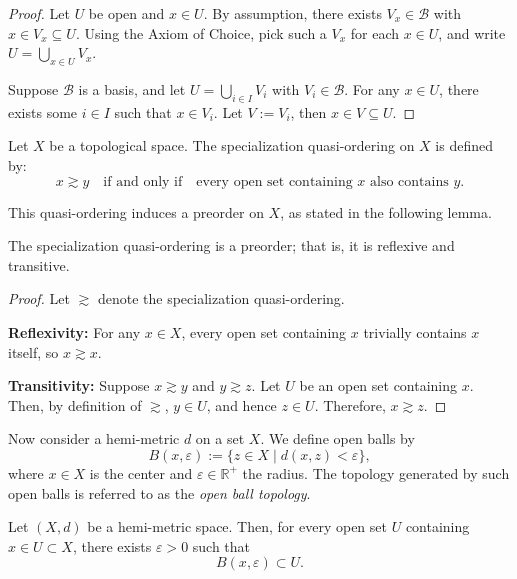 \begin{proof}
Let \(U\) be open and \(x \in U\). 
By assumption, there exists \(V_x \in \mathcal{B}\) with \(x \in V_x \subseteq U\).  
Using the Axiom of Choice, pick such a \(V_x\) for each \(x \in U\), and write \(U = \bigcup\limits_{x \in U} V_x\).

Suppose \(\mathcal{B}\) is a basis, and let \(U = \bigcup\limits_{i \in I} V_i\) with \(V_i \in \mathcal{B}\). 
For any \(x \in U\), there exists some \(i \in I\) such that \(x \in V_i\). Let \(V := V_i\), then \(x \in V \subseteq U\).
\end{proof}


\begin{definition}\label{def:quasi-ordering}
Let $X$ be a topological space. 
The specialization quasi-ordering on $X$ is defined by:
\[
x \gtrsim y \quad \text{if and only if} \quad \text{every open set containing } x \text{ also contains } y.
\]
\end{definition}

This quasi-ordering induces a preorder on $X$, as stated in the following lemma.


\begin{lemma}[Preorder]\label{lemma:preorder}
The specialization quasi-ordering is a preorder; that is, it is reflexive and transitive.
\end{lemma}


\begin{proof}
Let $\gtrsim$ denote the specialization quasi-ordering.

\textbf{Reflexivity:} For any $x \in X$, every open set containing $x$ trivially contains $x$ itself, so $x \gtrsim x$.

\textbf{Transitivity:} Suppose $x \gtrsim y$ and $y \gtrsim z$. Let $U$ be an open set containing $x$. Then, by definition of $\gtrsim$, $y \in U$, and hence $z \in U$. Therefore, $x \gtrsim z$.
\end{proof}


Now consider a hemi-metric $d$ on a set $X$. We define open balls by
\[
B(x, \varepsilon) := \{ z \in X \mid d(x, z) < \varepsilon \},
\]
where $x \in X$ is the center and $\varepsilon \in \mathbb{R}^+$ the radius.
The topology generated by such open balls is referred to as the \emph{open ball topology}.

\begin{lemma}\label{lemma:open_balls_form_base}
Let $(X, d)$ be a hemi-metric space.
Then, for every open set $U$ containing $x \in U \subset X$, there exists $\varepsilon > 0$ such that
\[
B(x, \varepsilon) \subset U.
\]
\end{lemma}

